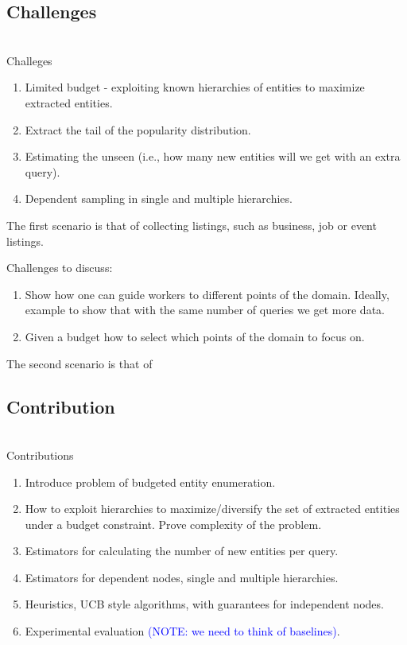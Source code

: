 \documentclass{vldb}
\begin{document}
\subsection{Challenges}
\ \\Challeges
\begin{enumerate}
\item Limited budget - exploiting known hierarchies of entities to maximize extracted entities.
\item Extract the tail of the popularity distribution.
\item Estimating the unseen (i.e., how many new entities will we get with an extra query).
\item Dependent sampling in single and multiple hierarchies.
\end{enumerate}

The first scenario is that of collecting listings, such as business, job or event listings.

Challenges to discuss:
\begin{enumerate}
\item Show how one can guide workers to different points of the domain. Ideally, example to show that with the same number of queries we get more data.
\item Given a budget how to select which points of the domain to focus on.
\end{enumerate}

The second scenario is that of 


\subsection{Contribution}
\ \\Contributions
\begin{enumerate}
\item Introduce problem of budgeted entity enumeration.
\item How to exploit hierarchies to maximize/diversify the set of extracted entities under a budget constraint. Prove complexity of the problem. 
\item Estimators for calculating the number of new entities per query.
\item Estimators for dependent nodes, single and multiple hierarchies.
\item Heuristics, UCB style algorithms, with guarantees for independent nodes.
\item Experimental evaluation \textcolor{blue}{(NOTE: we need to think of baselines)}.
\end{enumerate}
\end{document}
